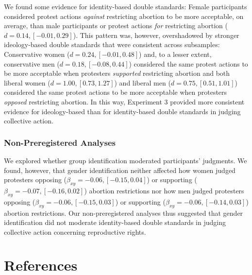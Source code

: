 \documentclass[12pt, letterpaper]{article}
\begin{document}
We found some evidence for identity-based double standards: Female
participants considered protest actions \emph{against} restricting
abortion to be more acceptable, on average, than male participants or
protest actions \emph{for} restricting abortion
(\(d = 0.14, [-0.01, 0.29]\)). This pattern was, however, overshadowed
by stronger ideology-based double standards that were consistent across
subsamples: Conservative women (\(d = 0.24, [-0.01, 0.48]\)) and, to a
lesser extent, conservative men (\(d = 0.18, [-0.08, 0.44]\)) considered
the same protest actions to be more acceptable when protesters
\emph{supported} restricting abortion and both liberal women
(\(d = 1.00, [0.73, 1.27]\)) and liberal men
(\(d = 0.75, [0.51, 1.01]\)) considered the same protest actions to be
more acceptable when protesters \emph{opposed} restricting abortion. In
this way, Experiment 3 provided more consistent evidence for
ideology-based than for identity-based double standards in judging
collective action.

\hypertarget{non-preregistered-analyses-1}{%
\subsubsection{Non-Preregistered
Analyses}\label{non-preregistered-analyses-1}}

We explored whether group identification moderated participants'
judgments. We found, however, that gender identification neither
affected how women judged protesters opposing
(\(\beta_{xy} = -0.06, [-0.15, 0.04]\)) or supporting
(\(\beta_{xy} = -0.07, [-0.16, 0.02]\)) abortion restrictions nor how
men judged protesters opposing (\(\beta_{xy} = -0.06, [-0.15, 0.03]\))
or supporting (\(\beta_{xy} = -0.06, [-0.14, 0.03]\)) abortion
restrictions. Our non-preregistered analyses thus suggested that gender
identification did not moderate identity-based double standards in
judging collective action concerning reproductive rights.

\newpage

\section*{References}

\begingroup

\noindent \setlength{\parindent}{-0.5in} \setlength{\leftskip}{0.5in}
\end{document}
